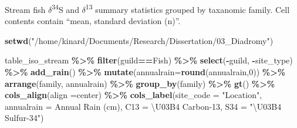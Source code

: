 \documentclass[
]{article}
\newenvironment{Shaded}{\begin{snugshade}}{\end{snugshade}}
\newcommand{\AttributeTok}[1]{\textcolor[rgb]{0.13,0.29,0.53}{#1}}
\newcommand{\DecValTok}[1]{\textcolor[rgb]{0.00,0.00,0.81}{#1}}
\newcommand{\FunctionTok}[1]{\textcolor[rgb]{0.13,0.29,0.53}{\textbf{#1}}}
\newcommand{\NormalTok}[1]{#1}
\newcommand{\SpecialCharTok}[1]{\textcolor[rgb]{0.81,0.36,0.00}{\textbf{#1}}}
\newcommand{\StringTok}[1]{\textcolor[rgb]{0.31,0.60,0.02}{#1}}
\begin{document}
Stream fish \(\delta\)\textsuperscript{34}S and
\(\delta\)\textsuperscript{13} summary statistics grouped by taxanomic
family. Cell contents contain ``mean, standard deviation (n)''.

\begin{Shaded}
\begin{Highlighting}[]
\FunctionTok{setwd}\NormalTok{(}\StringTok{"/home/kinard/Documents/Research/Dissertation/03\_Diadromy"}\NormalTok{)}

\NormalTok{table\_iso\_stream }\SpecialCharTok{\%\textgreater{}\%}
  \FunctionTok{filter}\NormalTok{(guild}\SpecialCharTok{==}\StringTok{\textquotesingle{}Fish\textquotesingle{}}\NormalTok{) }\SpecialCharTok{\%\textgreater{}\%}
  \FunctionTok{select}\NormalTok{(}\SpecialCharTok{{-}}\NormalTok{guild, }\SpecialCharTok{{-}}\NormalTok{site\_type) }\SpecialCharTok{\%\textgreater{}\%}
  \FunctionTok{add\_rain}\NormalTok{() }\SpecialCharTok{\%\textgreater{}\%}
  \FunctionTok{mutate}\NormalTok{(}\AttributeTok{annualrain=}\FunctionTok{round}\NormalTok{(annualrain,}\DecValTok{0}\NormalTok{)) }\SpecialCharTok{\%\textgreater{}\%}
  \FunctionTok{arrange}\NormalTok{(family, annualrain) }\SpecialCharTok{\%\textgreater{}\%}
  \FunctionTok{group\_by}\NormalTok{(family) }\SpecialCharTok{\%\textgreater{}\%}
  \FunctionTok{gt}\NormalTok{() }\SpecialCharTok{\%\textgreater{}\%}
  \FunctionTok{cols\_align}\NormalTok{(}\AttributeTok{align =}\StringTok{\textquotesingle{}center\textquotesingle{}}\NormalTok{) }\SpecialCharTok{\%\textgreater{}\%} 
  \FunctionTok{cols\_label}\NormalTok{(}\AttributeTok{site\_code =} \StringTok{"Location"}\NormalTok{,}
             \AttributeTok{annualrain =} \StringTok{\textquotesingle{}Annual Rain (cm)\textquotesingle{}}\NormalTok{,}
             \AttributeTok{C13 =} \StringTok{\textquotesingle{}\textbackslash{}U03B4 Carbon{-}13\textquotesingle{}}\NormalTok{,}
             \AttributeTok{S34 =} \StringTok{"\textbackslash{}U03B4 Sulfur{-}34"}\NormalTok{)}
\end{Highlighting}
\end{Shaded}
\end{document}
